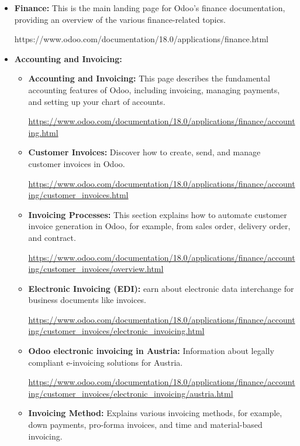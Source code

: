 \documentclass[11pt,a4paper]{article}
\begin{document}
\begin{itemize}
    \item \textbf{Finance:} This is the main landing page for Odoo's finance documentation, providing an overview of the various finance-related topics. 
    
    https://www.odoo.com/documentation/18.0/applications/finance.html

    \item \textbf{Accounting and Invoicing:}
    \begin{itemize}
        \item \textbf{Accounting and Invoicing:} This page describes the fundamental accounting features of Odoo, including invoicing, managing payments, and setting up your chart of accounts. 
        
        \url{https://www.odoo.com/documentation/18.0/applications/finance/accounting.html}

        \item \textbf{Customer Invoices:} Discover how to create, send, and manage customer invoices in Odoo. 
        
        \url{https://www.odoo.com/documentation/18.0/applications/finance/accounting/customer\_invoices.html}

        \item \textbf{Invoicing Processes:} This section explains how to automate customer invoice generation in Odoo, for example, from sales order, delivery order, and contract. 
        
        \url{https://www.odoo.com/documentation/18.0/applications/finance/accounting/customer\_invoices/overview.html}

        \item \textbf{Electronic Invoicing (EDI):} earn about electronic data interchange for business documents like invoices. 
        
        \url{https://www.odoo.com/documentation/18.0/applications/finance/accounting/customer\_invoices/electronic\_invoicing.html}

        \item \textbf{Odoo electronic invoicing in Austria:} Information about legally compliant e-invoicing solutions for Austria. 
        
        \url{https://www.odoo.com/documentation/18.0/applications/finance/accounting/customer\_invoices/electronic\_invoicing/austria.html}

        \item \textbf{Invoicing Method:} Explains various invoicing methods, for example, down payments, pro-forma invoices, and time and material-based invoicing. 
        

\end{itemize}
\end{itemize}
\end{document}
